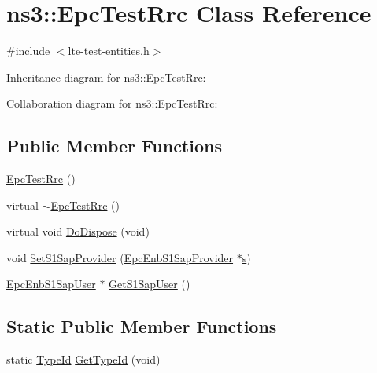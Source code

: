 \hypertarget{classns3_1_1EpcTestRrc}{}\section{ns3\+:\+:Epc\+Test\+Rrc Class Reference}
\label{classns3_1_1EpcTestRrc}


{\ttfamily \#include $<$lte-\/test-\/entities.\+h$>$}



Inheritance diagram for ns3\+:\+:Epc\+Test\+Rrc\+:


Collaboration diagram for ns3\+:\+:Epc\+Test\+Rrc\+:
\subsection*{Public Member Functions}
\begin{DoxyCompactItemize}
\item 
\hyperlink{classns3_1_1EpcTestRrc_a8ad85dcb85230a5bb4a5139c92787066}{Epc\+Test\+Rrc} ()
\item 
virtual \hyperlink{classns3_1_1EpcTestRrc_a8eca1039c57f8484cd0f19aa18cee113}{$\sim$\+Epc\+Test\+Rrc} ()
\item 
virtual void \hyperlink{classns3_1_1EpcTestRrc_a3eb5a487d39017f8d8dc2d1c98cd31a8}{Do\+Dispose} (void)
\item 
void \hyperlink{classns3_1_1EpcTestRrc_a4dc91a1208c2f22d76991df2f2bd15dc}{Set\+S1\+Sap\+Provider} (\hyperlink{classns3_1_1EpcEnbS1SapProvider}{Epc\+Enb\+S1\+Sap\+Provider} $\ast$\hyperlink{generate__test__data__lte__sinr_8m_ad83eeb3a142285d1243a08c6b7026df8}{s})
\item 
\hyperlink{classns3_1_1EpcEnbS1SapUser}{Epc\+Enb\+S1\+Sap\+User} $\ast$ \hyperlink{classns3_1_1EpcTestRrc_ac145e0e646ca9d170ed04d6b3b3b93c4}{Get\+S1\+Sap\+User} ()
\end{DoxyCompactItemize}
\subsection*{Static Public Member Functions}
\begin{DoxyCompactItemize}
\item 
static \hyperlink{classns3_1_1TypeId}{Type\+Id} \hyperlink{classns3_1_1EpcTestRrc_a4ace9695e45722635fe25c10a0e49a65}{Get\+Type\+Id} (void)
\end{DoxyCompactItemize}
